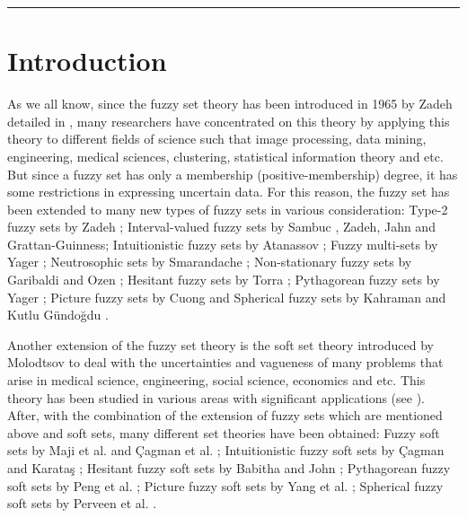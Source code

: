 \documentclass{IJFS}
\begin{document}
\Vol{*}	\No{*}	\Year{****}	\Pages{**}
\Received{**}	\Revised{**}		\Accepted{**}

{\let\newpage\relax\vspace*{.1mm}
\noindent\rule{\textwidth}{.3mm}\maketitle}

\thispagestyle{fancylogo}

\mabstract


\section{ Introduction}
As we all know, since the fuzzy set theory has been introduced in 1965 by Zadeh detailed in \cite{zadeh}, many researchers have concentrated on this theory by applying this theory to different fields of science such that image processing, data mining, engineering, medical sciences, clustering, statistical information theory and etc. But since a fuzzy set has only a membership (positive-membership) degree, it has some restrictions in expressing uncertain data. For this reason, the fuzzy set has been extended to many new types of fuzzy sets in various consideration: Type-2 fuzzy sets by Zadeh \cite{zadeh1}; Interval-valued fuzzy sets by Sambuc \cite{sam}, Zadeh, Jahn and Grattan-Guinness; Intuitionistic fuzzy sets by Atanassov \cite{ata}; Fuzzy multi-sets by Yager \cite{yager}; Neutrosophic sets by Smarandache \cite{sma}; Non-stationary fuzzy sets by Garibaldi and Ozen \cite{gari}; Hesitant fuzzy sets by Torra \cite{tor}; Pythagorean fuzzy sets by Yager \cite{yager1}; Picture fuzzy sets by Cuong \cite{cuon} and Spherical fuzzy sets by Kahraman and Kutlu G\"{u}ndo\u gdu \cite{kut0}.

Another extension of the fuzzy set theory is the soft set theory introduced by Molodtsov \cite{mol} to deal with the uncertainties and vagueness  of many problems that arise in medical science,
engineering, social science,  economics and etc. This theory has been studied in various areas with significant applications (see \cite{aa, cet,2s,  maji, pazar}). After, with the combination of the
extension of fuzzy sets which are mentioned above and soft sets, many different set theories have been obtained: Fuzzy soft sets by Maji et al. \cite{maji1} and \c{C}agman et al. \cite{cag}; Intuitionistic fuzzy soft sets by \c{C}agman and Karata\c s \cite{cag1}; Hesitant fuzzy soft sets by Babitha and John
\cite{babit}; Pythagorean fuzzy soft sets by Peng et al. \cite{peng}; Picture fuzzy soft sets by Yang et al. \cite{yang}; Spherical fuzzy soft sets by Perveen et al. \cite{per}.
\end{document}
